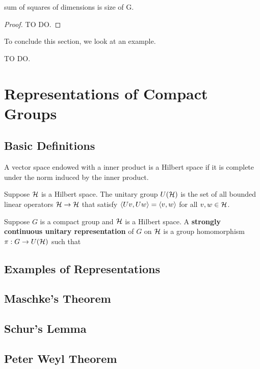 \documentclass[a4paper]{article}
\begin{document}
\begin{thm}
    sum of squares of dimensions is size of G.
\end{thm}

\begin{proof}
    TO DO.
\end{proof}

To conclude this section, we look at an example.

\begin{eg}
    TO DO.
\end{eg}

\section{Representations of Compact Groups}
\subsection{Basic Definitions}
\begin{defi}
    A vector space endowed with a inner product is a Hilbert space if it is complete under the norm induced by the inner product.
\end{defi}

\begin{defi}
    Suppose $\mathcal{H}$ is a Hilbert space. The unitary group $U(\mathcal{H})$ is the set of all bounded linear operators $\mathcal{H} \to \mathcal{H}$ that satisfy $\left\langle Uv , Uw \right\rangle = \left\langle v , w \right\rangle$ for all $v, w \in \mathcal{H}$.
\end{defi}

\begin{defi}
    Suppose $G$ is a compact group and $\mathcal{H}$ is a Hilbert space. A \textbf{strongly continuous unitary representation} of $G$ on $\mathcal{H}$ is a group homomorphism $\pi : G \to U(\mathcal{H})$ such that 
\end{defi}

\subsection{Examples of Representations}
\subsection{Maschke's Theorem}
\subsection{Schur's Lemma}
\subsection{Peter Weyl Theorem}
\end{document}

